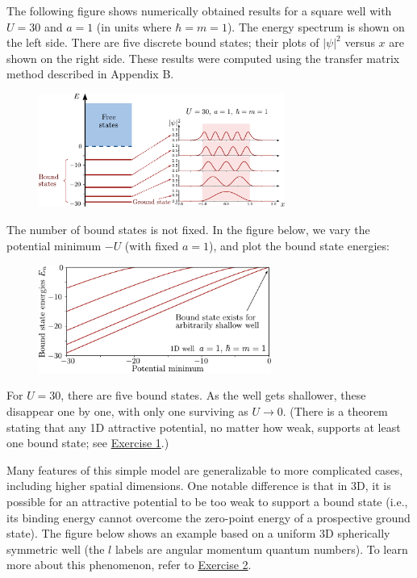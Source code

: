 \documentclass[prx,12pt]{revtex4-2}
\begin{document}
The following figure shows numerically obtained results for a square
well with $U = 30$ and $a=1$ (in units where $\hbar = m =1$).  The
energy spectrum is shown on the left side.  There are five discrete
bound states; their plots of $|\psi|^2$ versus $x$ are shown on the
right side.  These results were computed using the transfer matrix
method described in Appendix B.

\begin{figure}[h]
  \centering\includegraphics[width=0.72\textwidth]{boundvsextended}
\end{figure}

\clearpage
The number of bound states is not fixed.  In the figure below, we vary
the potential minimum $-U$ (with fixed $a = 1$), and plot the bound
state energies:

\vskip 0.15in
\begin{figure}[h]
  \centering\includegraphics[width=0.68\textwidth]{boundstate1d}
\end{figure}

\noindent
For $U = 30$, there are five bound states.  As the well gets
shallower, these disappear one by one, with only one surviving as $U
\rightarrow 0$.  (There is a theorem stating that any 1D attractive
potential, no matter how weak, supports at least one bound state; see
\hyperref[ex:boundstate]{Exercise 1}.)

Many features of this simple model are generalizable to more
complicated cases, including higher spatial dimensions.  One notable
difference is that in 3D, it is possible for an attractive potential
to be too weak to support a bound state (i.e., its binding energy
cannot overcome the zero-point energy of a prospective ground state).
The figure below shows an example based on a uniform 3D spherically
symmetric well (the $l$ labels are angular momentum quantum numbers).
To learn more about this phenomenon, refer to
\hyperref[ex:boundstate3d]{Exercise 2}.
\end{document}
